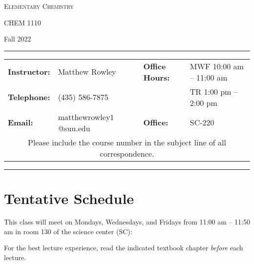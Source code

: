 \documentclass[12pt, letterpaper]{article}
\begin{document}
\begin{center}
	{\Large \textsc{Elementary Chemistry}}
	
	CHEM 1110
\end{center}
\begin{center}
	{\large Fall 2022}
\end{center}
\begin{center}
	\rule{0.99\textwidth}{0.4pt}
	\begin{tabular}{llcll}
		\textbf{Instructor:} & Matthew Rowley           &  & \textbf{Office Hours:} & MWF 10:00 am -- 11:00 am \\
		\textbf{Telephone:}  & (435) 586-7875           &  &                        & TR 1:00 pm -- 2:00 pm    \\
		\textbf{Email:}      & matthewrowley$1$@suu.edu &  & \textbf{Office:}       & SC-220                   \\
		\multicolumn{5}{c}{Please include the course number in the subject line of all correspondence.}
	\end{tabular}
	\rule{0.99\textwidth}{0.4pt}
\end{center}

\section*{Tentative Schedule}
This class will meet on Mondays, Wednesdays, and Fridays from 11:00 am -- 11:50
am in room 130 of the science center (SC):

\noindent For the best lecture experience, read the indicated textbook chapter \emph{before} each lecture.
\end{document}
